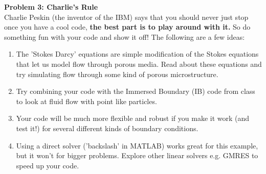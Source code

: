 \documentclass[answers,12pt]{exam}
\newcommand{\mysol}[1]{\begin{solution} #1 \end{solution}}
\begin{document}
\begin{questions}
{}


\question \textbf{Problem 3: Charlie's Rule} \\
Charlie Peskin (the inventor of the IBM) says that you should never just stop once you have a cool code, \textbf{the best part is to play around with it.} So do something fun with your code and show it off! The following are a few ideas:
\begin{enumerate}
    \item The 'Stokes Darcy' equations are simple modification of the Stokes equations that let us model flow through porous media. Read about these equations and try simulating flow through some kind of porous microstructure.
    \item Try combining your code with the Immersed Boundary (IB) code from class to look at fluid flow with point like particles.
    \item Your code will be much more flexible and robust if you make it work (and test it!) for several different kinds of boundary conditions.
    \item Using a direct solver ('backslash' in MATLAB) works great for this example, but it won't for bigger problems. Explore other linear solvers e.g. GMRES to speed up your code.
\end{enumerate}

    \mysol{
    
    }



	\end{questions}
\end{document}
